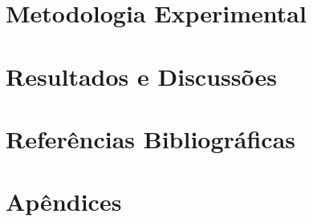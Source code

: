 






    
    \section{Metodologia Experimental}\label{Metodologia Experimental}
        
    
    \section{Resultados e Discussões}\label{Resultados e Discussões}
        
        
        
        
    
    \clearpage
    \section{Referências Bibliográficas}
        
    
    \clearpage
    \section{Apêndices}\label{Apêndices}
        
        
